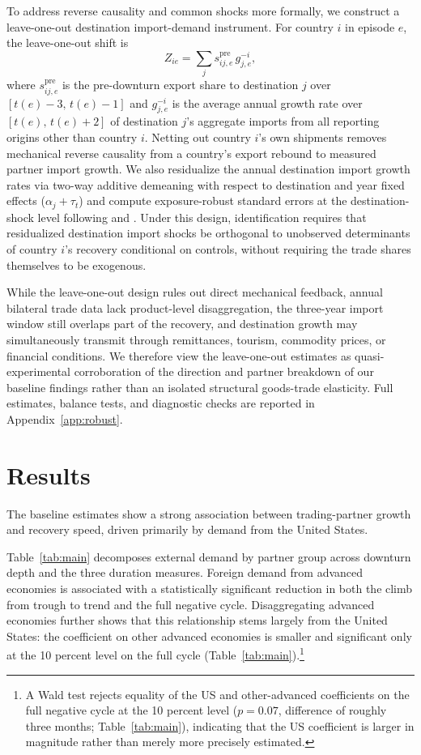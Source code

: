 \documentclass[12pt, a4paper]{article}
\begin{document}
To address reverse causality and common shocks more formally, we construct a leave-one-out destination import-demand instrument. For country $i$ in episode $e$, the leave-one-out shift is
\begin{equation}
Z_{ie}=\sum_j s_{ij,e}^{\text{pre}}\,g_{j,e}^{-i},
\label{eq:loo_shift}
\end{equation}
where $s_{ij,e}^{\text{pre}}$ is the pre-downturn export share to destination $j$ over $[t(e)-3,\, t(e)-1]$ and $g_{j,e}^{-i}$ is the average annual growth rate over $[t(e),\, t(e)+2]$ of destination $j$'s aggregate imports from all reporting origins other than country $i$. Netting out country $i$'s own shipments removes mechanical reverse causality from a country's export rebound to measured partner import growth. We also residualize the annual destination import growth rates via two-way additive demeaning with respect to destination and year fixed effects ($\alpha_j + \tau_t$) and compute exposure-robust standard errors at the destination-shock level following \citet{adao2019} and \citet{borusyak2022}. Under this design, identification requires that residualized destination import shocks be orthogonal to unobserved determinants of country $i$'s recovery conditional on controls, without requiring the trade shares themselves to be exogenous.

While the leave-one-out design rules out direct mechanical feedback, annual bilateral trade data lack product-level disaggregation, the three-year import window still overlaps part of the recovery, and destination growth may simultaneously transmit through remittances, tourism, commodity prices, or financial conditions. We therefore view the leave-one-out estimates as quasi-experimental corroboration of the direction and partner breakdown of our baseline findings rather than an isolated structural goods-trade elasticity. Full estimates, balance tests, and diagnostic checks are reported in Appendix~\ref{app:robust}.
\section{Results}\label{sec:results}

The baseline estimates show a strong association between trading-partner growth and recovery speed, driven primarily by demand from the United States.

Table~\ref{tab:main} decomposes external demand by partner group across downturn depth and the three duration measures. Foreign demand from advanced economies is associated with a statistically significant reduction in both the climb from trough to trend and the full negative cycle. Disaggregating advanced economies further shows that this relationship stems largely from the United States: the coefficient on other advanced economies is smaller and significant only at the 10 percent level on the full cycle (Table~\ref{tab:main}).\footnote{A Wald test rejects equality of the US and other-advanced coefficients on the full negative cycle at the 10 percent level ($p=0.07$, difference of roughly three months; Table~\ref{tab:main}), indicating that the US coefficient is larger in magnitude rather than merely more precisely estimated.}
\end{document}
